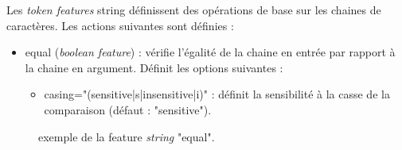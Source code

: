 \documentclass[manual-fr.tex]{subfiles}
\begin{document}
Les \textit{token features} string définissent des opérations de base sur les chaines de caractères. Les actions suivantes sont définies :
\begin{itemize}
    \item equal (\textit{boolean feature}) : vérifie l'égalité de la chaine en entrée par rapport à la chaine en argument. Définit les options suivantes :
    \begin{itemize}
        \item casing="(sensitive|s|insensitive|i)" : définit la sensibilité à la casse de la comparaison (défaut : "sensitive").
    \end{itemize}
\end{itemize}

\begin{figure}[ht!]
\footnotesize
\begin{xml}
\end{xml}
\caption{exemple de la feature \textit{string} "equal".}
\label{fig:feature-string-equal}
\end{figure}
\end{document}
